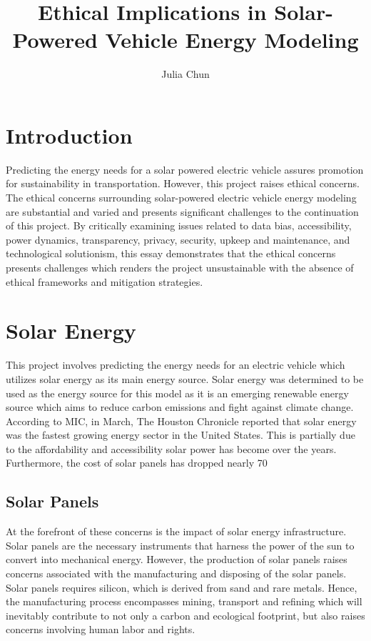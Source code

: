\documentclass[10pt,twocolumn]{article}
\title{Ethical Implications in Solar-Powered Vehicle Energy Modeling}
\author{Julia Chun}
\affiliation{Occidental College}
\begin{document}
\maketitle

\section{Introduction}
Predicting the energy needs for a solar powered electric vehicle assures promotion for sustainability in transportation. However, this project raises ethical concerns. The ethical concerns surrounding solar-powered electric vehicle energy modeling are substantial and varied and presents significant challenges to the continuation of this project. By critically examining issues related to data bias, accessibility, power dynamics, transparency, privacy, security, upkeep and maintenance, and technological solutionism, this essay demonstrates that the ethical concerns presents challenges which renders the project unsustainable with the absence of ethical frameworks and mitigation strategies. 
\section{Solar Energy}
This project involves predicting the energy needs for an electric vehicle which utilizes solar energy as its main energy source. Solar energy was determined to be used as the energy source for this model as it is an emerging renewable energy source which aims to reduce carbon emissions and fight against climate change. According to MIC, in March, The Houston Chronicle reported that solar energy was the fastest growing energy sector in the United States. This is partially due to the affordability and accessibility solar power has become over the years. Furthermore, the cost of solar panels has dropped nearly 70%
\subsection{Solar Panels}
At the forefront of these concerns is the impact of solar energy infrastructure. Solar panels are the necessary instruments that harness the power of the sun to convert into mechanical energy. However, the production of solar panels raises concerns associated with the manufacturing and disposing of the solar panels. Solar panels requires silicon, which is derived from sand  and rare metals. Hence, the manufacturing process encompasses mining, transport and refining which will inevitably contribute to not only a carbon and ecological footprint, but also raises concerns involving human labor and rights. 
\end{document}
